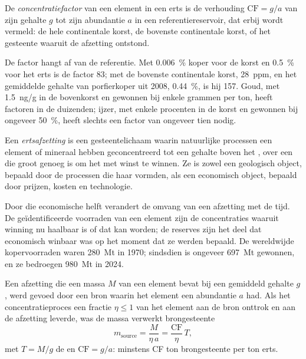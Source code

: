 \begin{definition}[Concentratiefactor]\label{def:b2:ore-deposits:cf}
De \emph{concentratiefactor} van een element in een erts is de verhouding
$\mathrm{CF} = g/a$ van zijn gehalte $g$ tot zijn abundantie $a$ in een referentiereservoir, dat erbij wordt vermeld:
de hele continentale korst, de bovenste continentale korst, of het gesteente waaruit de afzetting ontstond.
\end{definition}

De factor hangt af van de referentie. Met \qty{0.006}{\percent} koper voor de korst en
\qty{0.5}{\percent} voor het erts is de factor 83; met de bovenste continentale korst,
\qty{28}{ppm}, en het gemiddelde gehalte van porfierkoper uit 2008, \qty{0.44}{\percent}, is hij 157. Goud,
met \qty{1.5}{ng/g} in de bovenkorst en gewonnen bij enkele grammen per ton, heeft factoren in de
duizenden; ijzer, met enkele procenten in de korst en gewonnen bij ongeveer \qty{50}{\percent}, heeft
slechts een factor van ongeveer tien nodig.

\begin{definition}[Ertsafzetting]\label{def:b2:ore-deposits:deposit}
Een \emph{ertsafzetting} is een gesteentelichaam waarin natuurlijke processen
een element of mineraal hebben geconcentreerd tot een gehalte boven het , over een  die groot genoeg is
om het met winst te winnen. Ze is zowel een geologisch object, bepaald door de processen die
haar vormden, als een economisch object, bepaald door prijzen, kosten en technologie.
\end{definition}

Door die economische helft verandert de omvang van een afzetting met de tijd. De geïdentificeerde voorraden
van een element zijn de concentraties waaruit winning nu haalbaar is of dat kan worden; de
reserves zijn het deel dat economisch winbaar was op het moment dat ze werden bepaald. De wereldwijde
kopervoorraden waren \qty{280}{Mt} in 1970; sindsdien is ongeveer \qty{697}{Mt} gewonnen, en ze
bedroegen \qty{980}{Mt} in 2024.

\begin{proposition}\label{prop:b2:ore-deposits:mass-balance}
Een afzetting die een massa $M$ van een element bevat bij een gemiddeld gehalte $g$, werd gevoed door een bron waarin het
element een abundantie $a$ had. Als het concentratieproces een fractie $\eta \leq 1$ van het
element aan de bron onttrok en aan de afzetting leverde, was de massa verwerkt brongesteente
\begin{equation}
m_{\mathrm{source}} = \frac{M}{\eta\,a} = \frac{\mathrm{CF}}{\eta}\, T ,
\label{eq:b2:ore-deposits:mass-balance}
\end{equation}
met $T = M/g$ de  en $\mathrm{CF} = g/a$: minstens CF ton brongesteente per ton erts.
\end{proposition}

